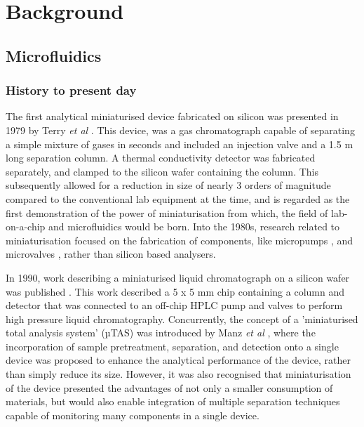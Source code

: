 
\chapter{Background}

\section{Microfluidics}

\subsection{History to present day}

The first analytical miniaturised device fabricated on silicon was presented in 1979 by Terry \textit{et al}
\citep{terry1979ieee}. This device, was a gas chromatograph capable of separating a simple mixture of gases
in seconds and included an injection valve and a 1.5 m long separation column. A thermal conductivity detector
was fabricated separately, and clamped to the silicon wafer containing the column. This subsequently allowed for
a reduction in size of nearly 3 orders of magnitude compared to the conventional lab equipment at the time,
and is regarded \citep{reyes2002micro} as the first demonstration of the power of miniaturisation from which, the
field of lab-on-a-chip and microfluidics would be born.
Into the 1980s, research related to miniaturisation focused on the fabrication of
components, like micropumps \citep{van1988piezoelectric,van1989thermo}, and microvalves \citep{shoji1988prototype},
rather than silicon based analysers.

In 1990, work describing a miniaturised liquid chromatograph on a silicon
wafer was published \citep{manz1990design}. This work described a 5 x 5 mm chip containing a
column and detector that was connected to an off-chip HPLC pump and valves to perform high pressure
liquid chromatography. Concurrently, the concept of a 'miniaturised total analysis system' (µTAS) was introduced
by Manz \textit{et al} \citep{manz1990miniaturized}, where the incorporation of sample pretreatment, separation,
and detection onto a single device was proposed to enhance the analytical performance of the device, rather
than simply reduce its size. However, it was also recognised that miniaturisation of the device
presented the advantages of not only a smaller consumption of materials, but would also
enable integration of multiple separation techniques capable of monitoring many components in a single device.

